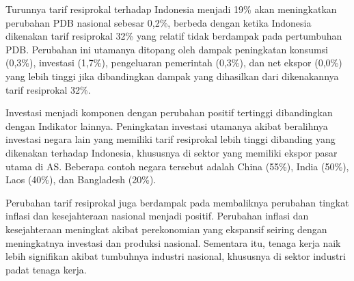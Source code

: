 \documentclass[
]{interact}
\begin{document}
Turunnya tarif resiprokal terhadap Indonesia menjadi 19\% akan
meningkatkan perubahan PDB nasional sebesar 0,2\%, berbeda dengan ketika
Indonesia dikenakan tarif resiprokal 32\% yang relatif tidak berdampak
pada pertumbuhan PDB. Perubahan ini utamanya ditopang oleh dampak
peningkatan konsumsi (0,3\%), investasi (1,7\%), pengeluaran pemerintah
(0,3\%), dan net ekspor (0,0\%) yang lebih tinggi jika dibandingkan
dampak yang dihasilkan dari dikenakannya tarif resiprokal 32\%.

Investasi menjadi komponen dengan perubahan positif tertinggi
dibandingkan dengan Indikator lainnya. Peningkatan investasi utamanya
akibat beralihnya investasi negara lain yang memiliki tarif resiprokal
lebih tinggi dibanding yang dikenakan terhadap Indonesia, khususnya di
sektor yang memiliki ekspor pasar utama di AS. Beberapa contoh negara
tersebut adalah China (55\%), India (50\%), Laos (40\%), dan Bangladesh
(20\%).

Perubahan tarif resiprokal juga berdampak pada membaliknya perubahan
tingkat inflasi dan kesejahteraan nasional menjadi positif. Perubahan
inflasi dan kesejahteraan meningkat akibat perekonomian yang ekspansif
seiring dengan meningkatnya investasi dan produksi nasional. Sementara
itu, tenaga kerja naik lebih signifikan akibat tumbuhnya industri
nasional, khususnya di sektor industri padat tenaga kerja.
\end{document}
